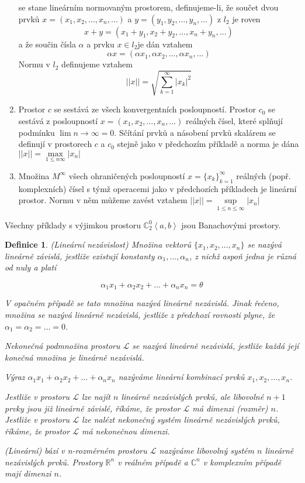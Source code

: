 \documentclass[a4paper, 11pt]{report}
\newtheorem{mydef}{Definice}[chapter]
\begin{document}
\begin{enumerate}
	se stane lineárním normovaným prostorem, definujeme-li, že součet dvou prvků $x = (x_1, x_2, \dots, x_n, \dots)$ a $y = (y_1, y_2, \dots, y_n, \dots)$ z $l_2$ je roven
	$$x + y = (x_1 + y_1, x_2 + y_2, \dots, x_n + y_n, \dots)$$
	a že součin čísla $\alpha$ a prvku $x \in l_2$je dán vztahem
	$$\alpha x = (\alpha x_1, \alpha x_2, \dots, \alpha x_n, \dots)$$
	Normu v $l_2$ definujeme vztahem
	$$||x|| = \sqrt{\sum\limits_{k = 1}^\infty |x_k|^2}$$
	\item Prostor $c$ se sestává ze všech konvergentních posloupností. Prostor $c_0$ se sestává z posloupností $x = (x_1, x_2, \dots, x_n, \dots)$ reálných čísel, které splňují podmínku $\lim\limits{n \to \infty} = 0$. Sčítání prvků a násobení prvků skalárem se definují v prostorech $c$ a $c_0$ stejně jako v předchozím příkladě a norma je dána $||x|| = \max\limits_{1 \leq n \infty} |x_n|$
	\item Množina $M^\infty$ všech ohraničených posloupností $x = \{x_k\}_{k=1}^\infty$ reálných (popř. komplexních) čísel s týmž operacemi jako v předchozích příkladech je lineární prostor. Normu v něm můžeme zavést vztahem $||x|| = \sup\limits_{1\leq n\leq \infty} |x_n|$
\end{enumerate}
Všechny příklady s výjimkou prostoru $\mathbb{C}_2^0\left<a,b\right>$ jsou Banachovými prostory.

\begin{mydef}
(Lineární nezávislost) Množina vektorů $\{x_1, x_2, \dots, x_n\}$ se nazývá lineárně závislá, jestliže existují konstanty $\alpha_1, \dots, \alpha_n$, z nichž aspoň jedna je různá od nuly a platí

$$\alpha_1 x_1 + \alpha_2 x_2 + \dots + \alpha_n x_n = \theta$$

V opačném případě se tato množina nazývá lineárně nezávislá. Jinak řečeno, množina se nazývá lineárně nezávislá, jestliže z předchozí rovnosti plyne, že $\alpha_1 = \alpha_2 = \dots = 0$.

Nekonečná podmnožina prostoru $\mathcal{L}$ se nazývá \emph{lineárně nezávislá}, jestliže každá její konečná množina je lineárně nezávislá.

Výraz $\alpha_1 x_1 + \alpha_2 x_2 + \dots + \alpha_n x_n$ nazýváme lineární kombinací prvků $x_1, x_2, \dots, x_n$.

Jestliže v prostoru $\mathcal{L}$ lze najít $n$ lineárně nezávislých prvků, ale libovolné $n+1$ prvky jsou již lineárně závislé, říkáme, že prostor $\mathcal{L}$ má \emph{dimenzi (rozměr)} $n$. Jestliže v prostoru $\mathcal{L}$ lze nalézt nekonečný systém lineárně nezávislých prvků, říkáme, že prostor $\mathcal{L}$ má nekonečnou dimenzi.

\emph{(Lineární) bází v n-rozměrném prostoru $\mathcal{L}$} nazýváme libovolný systém $n$ lineárně nezávislých prvků. Prostory $\mathbb{R}^n$ v reálném případě a $\mathbb{C}^n$ v komplexním případě mají dimenzi $n$.
\end{mydef}
\end{document}
